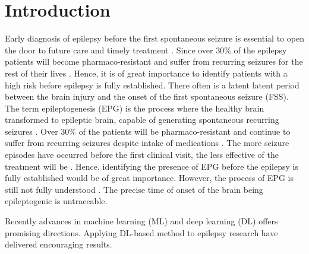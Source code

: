 \documentclass{article}
\begin{document}
	\section{Introduction}
	Early diagnosis of epilepsy before the first spontaneous seizure is essential to open the door to future care and timely treatment \cite{moshe2015epilepsy}. Since over 30\% of the epilepsy patients will become pharmaco-resistant and suffer from recurring seizures for the rest of their lives \citep{kwan2000early}. Hence, it is of great importance to identify patients with a high risk before epilepsy is fully established. There often is a latent latent period between the brain injury and the onset of the first spontaneous seizure (FSS). The term epileptogenesis (EPG) is the process where the healthy brain transformed to epileptic brain, capable of generating spontaneous recurring seizures \cite{loscher2019holy, pitkanen2014past}.  Over 30\% of the patients will be pharmaco-resistant and continue to suffer from recurring seizures despite intake of medications \citep{kwan2000early}. The more seizure episodes have occurred before the first clinical visit, the less effective of the treatment will be \citep{kwan2000early}. Hence, identifying the presence of EPG before the epilepsy is fully established would be of great importance. However, the process of EPG is still not fully understood \citep{pitkanen2016advances}. The precise time of onset of the brain being epileptogenic is untraceable.
	
	Recently advances in machine learning (ML) and deep learning (DL) offers promising directions. Applying DL-based method to epilepsy research have delivered encouraging results. \cite{lu2020towards}
	
\end{document}
